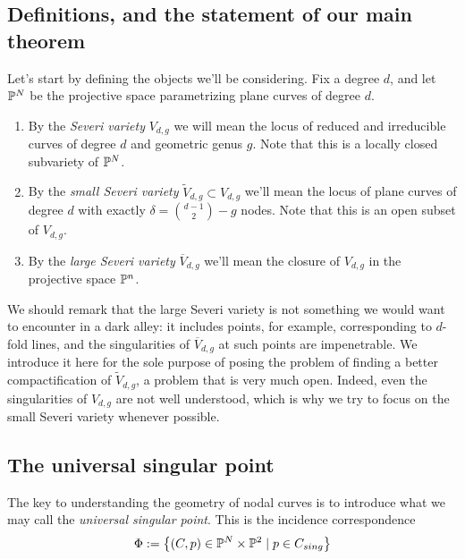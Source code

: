 \subsection{Definitions, and the statement of our main theorem}

Let's start by defining the objects we'll be considering. Fix a degree $d$, and let ${\mathbb P}^N$ be the projective space parametrizing plane curves of degree $d$.

\begin{definition} 
\begin{enumerate}
\item By the \emph{Severi variety} $V_{d,g}$ we will mean the locus of reduced and irreducible curves of degree $d$ and geometric genus $g$. Note that this is a locally closed subvariety of ${\mathbb P}^N$.

\item By the \emph{small Severi variety} $\tilde V_{d,g} \subset V_{d,g}$ we'll mean the locus of plane curves of degree $d$ with exactly $\delta = \binom{d-1}{2} - g$ nodes. Note that this is an open subset of $V_{d,g}$.

\item By the \emph{large Severi variety} $\overline V_{d,g}$ we'll mean the closure of $V_{d,g}$ in the projective space ${\mathbb P}^n$.
\end{enumerate}
\end{definition}

We should remark that the large Severi variety is not something we would want to encounter in a dark alley: it includes points, for example, corresponding to $d$-fold lines, and the singularities of $\overline V_{d,g}$ at such points are impenetrable. We introduce it here for the sole purpose of posing the problem of finding a better compactification of $\tilde V_{d,g}$, a problem that is very much open. Indeed, even the singularities of $V_{d,g}$  are not well understood, which is why we try to focus on the small Severi variety whenever possible.

\subsection{The universal singular point}

The key to understanding the geometry of nodal curves is to introduce what we may call the \emph{universal singular point}. This is the incidence correspondence
$$
\Phi := \left\{ (C, p) \in {\mathbb P}^N \times {\mathbb P}^2 \mid p \in C_{sing} \right\}
$$

